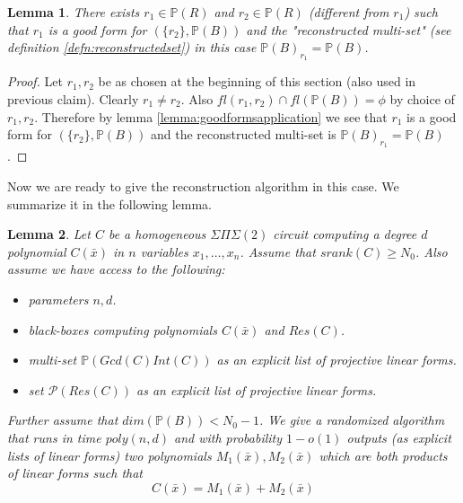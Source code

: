 \documentclass[12pt]{caltech_thesis}
\theoremstyle{plain}
\newtheorem{lemma}{Lemma}
\theoremstyle{definition}
\newcommand{\MP}{\mathcal{P}}
\newcommand{\PP}{\mathbb{P}}
\newcommand{\B}[1]{\bar{#1}}
\begin{document}
\begin{lemma}\label{lemma:foundgoodform}
 There exists $r_1\in \PP(R)$ and $r_2\in \PP(R)$ (different from $r_1$) such that $r_1$ is a good form for $(\{r_2\},\PP(B))$ and the
 \emph{"reconstructed multi-set"} (see definition \ref{defn:reconstructedset}) in this case $\PP(B)_{r_1} = \PP(B)$.
\end{lemma}
\begin{proof} 
Let $r_1,r_2$ be as chosen at the beginning of this section (also used in previous claim). Clearly $r_1\neq r_2$. 
Also $fl(r_1,r_2)\cap fl(\PP(B)) =\phi$ by choice of $r_1,r_2$. Therefore by lemma \ref{lemma:goodformsapplication} we see that
$r_1$ is a good form for $(\{r_2\}, \PP(B))$ and the reconstructed multi-set is $\PP(B)_{r_1} = \PP(B)$.
\end{proof}

 Now we are ready to give the reconstruction algorithm in this case. We summarize it in the following lemma.
 \begin{lemma}
 Let $C$ be a homogeneous $\Sigma\Pi\Sigma(2)$ circuit computing a degree $d$ polynomial $C(\B{x})$ in $n$ variables $x_1,\ldots,x_n$. 
Assume that $srank(C)\geq N_0$. Also assume we have access to the following:
\begin{itemize}
\renewcommand\labelitemi{--}
\item parameters $n,d$.
 \item black-boxes computing polynomials $C(\B{x})$ and $Res(C)$.
 \item multi-set $\PP(Gcd(C)Int(C))$ as an explicit list of projective linear forms.
 \item set $\MP(Res(C))$ as an explicit list of projective linear forms.
\end{itemize}
Further assume that $dim(\PP(B)) <N_0-1$. We give a randomized algorithm that runs in time $poly(n,d)$ and with probability 
$1-o(1)$ outputs (as explicit lists of linear forms) two polynomials
$M_1(\B{x}), M_2(\B{x})$ which are both products of linear forms such that
\[
 C(\B{x}) = M_1(\B{x}) + M_2(\B{x})
\]
 \end{lemma}
\end{document}
